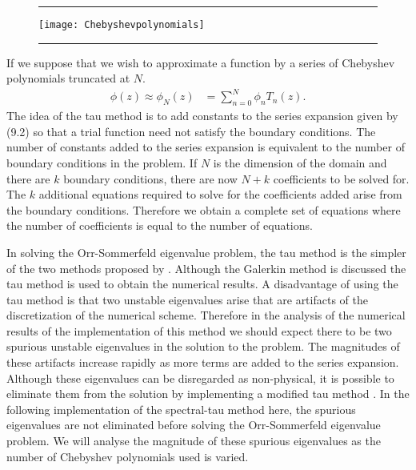 \documentclass[a4paper, 12pt, twoside, openright]{article}
\numberwithin{equation}{section}
\begin{document}
\begin{figure}[H]
\centering 
\rule{\linewidth}{1.5pt}
\texttt{[image: Chebyshevpolynomials]}
\rule{\linewidth}{1.5pt}
\end{figure}

If we suppose that we wish to approximate a function by a series of Chebyshev polynomials truncated at $N$.
\begin{align}
\phi(z) \approx \phi_{N}(z) &= \sum_{n=0}^{N} \phi_n T_n (z). 
\end{align}
The idea of the tau method is to add constants to the series expansion given by (9.2) so that a trial function need not satisfy the boundary conditions. The number of constants added to the series expansion is equivalent to the number of boundary conditions in the problem. If $N$ is the dimension of the domain and there are $k$ boundary conditions, there are now $N+k$ coefficients to be solved for. The $k$ additional equations required to solve for the coefficients added arise from the boundary conditions. Therefore we obtain a complete set of equations where the number of coefficients is equal to the number of equations. %

In solving the Orr-Sommerfeld eigenvalue problem, the tau method is the simpler of the two methods proposed by \cite{Orszag71}. Although the Galerkin method is discussed the tau method is used to obtain the numerical results. A disadvantage of using the tau method is that two unstable eigenvalues arise that are artifacts of the discretization of the numerical scheme. Therefore in the analysis of the numerical results of the implementation of this method we should expect there to be two spurious unstable eigenvalues in the solution to the problem. The magnitudes of these artifacts increase rapidly as more terms are added to the series expansion. Although these eigenvalues can be disregarded as non-physical, it is possible to eliminate them from the solution by implementing a modified tau method \citep{Mcfadden90}. In the following implementation of the spectral-tau method here, the spurious eigenvalues are not eliminated before solving the Orr-Sommerfeld eigenvalue problem. We will analyse the magnitude of these spurious eigenvalues as the number of Chebyshev polynomials used is varied. %
\end{document}

